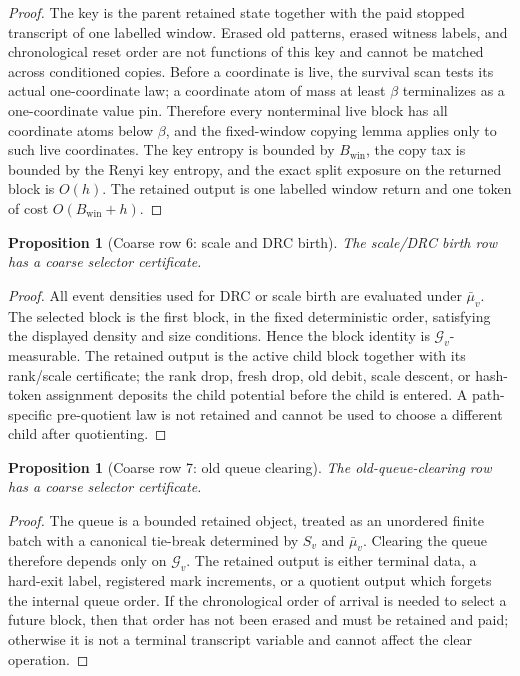 \documentclass[11pt]{article}
\newtheorem{proposition}[theorem]{Proposition}
\theoremstyle{remark}
\newcommand{\G}{\mathcal G}
\newcommand{\win}{\mathrm{win}}
\begin{document}
\begin{proof}
The key is the parent retained state together with the paid stopped transcript of one labelled window.  Erased old patterns, erased witness labels, and chronological reset order are not functions of this key and cannot be matched across conditioned copies.  Before a coordinate is live, the survival scan tests its actual one-coordinate law; a coordinate atom of mass at least $\beta$ terminalizes as a one-coordinate value pin.  Therefore every nonterminal live block has all coordinate atoms below $\beta$, and the fixed-window copying lemma applies only to such live coordinates.  The key entropy is bounded by $B_{\win}$, the copy tax is bounded by the Renyi key entropy, and the exact split exposure on the returned block is $O(h)$.  The retained output is one labelled window return and one token of cost $O(B_{\win}+h)$.
\end{proof}

\begin{proposition}[Coarse row 6: scale and DRC birth]\label{prop:coarse-row-scale-drc}
The scale/DRC birth row has a coarse selector certificate.
\end{proposition}

\begin{proof}
All event densities used for DRC or scale birth are evaluated under $\bar\mu_v$.  The selected block is the first block, in the fixed deterministic order, satisfying the displayed density and size conditions.  Hence the block identity is $\G_v$-measurable.  The retained output is the active child block together with its rank/scale certificate; the rank drop, fresh drop, old debit, scale descent, or hash-token assignment deposits the child potential before the child is entered.  A path-specific pre-quotient law is not retained and cannot be used to choose a different child after quotienting.
\end{proof}

\begin{proposition}[Coarse row 7: old queue clearing]\label{prop:coarse-row-old-queue}
The old-queue-clearing row has a coarse selector certificate.
\end{proposition}

\begin{proof}
The queue is a bounded retained object, treated as an unordered finite batch with a canonical tie-break determined by $S_v$ and $\bar\mu_v$.  Clearing the queue therefore depends only on $\G_v$.  The retained output is either terminal data, a hard-exit label, registered mark increments, or a quotient output which forgets the internal queue order.  If the chronological order of arrival is needed to select a future block, then that order has not been erased and must be retained and paid; otherwise it is not a terminal transcript variable and cannot affect the clear operation.
\end{proof}
\end{document}
